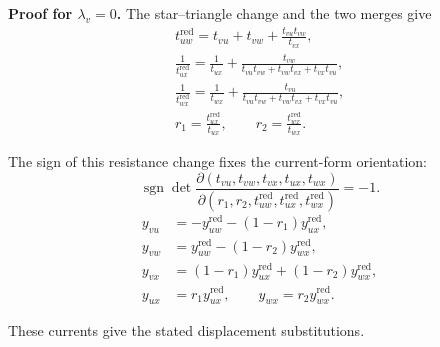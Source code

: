 \documentclass[11pt]{article}
\numberwithin{equation}{section}
\numberwithin{figure}{section}
\numberwithin{table}{section}
\begin{document}
\begin{proofbox}
\textbf{Proof for $\lambda_v=0$.} The star--triangle change \cite[Lemma 2.4.23]{Panzer} and the two merges give
\begin{equation*}
\begin{gathered}
t_{uw}^{\mathrm{red}}
=t_{vu}+t_{vw}+\frac{t_{vu}t_{vw}}{t_{vx}},\\
\frac1{t_{ux}^{\mathrm{red}}}
=\frac1{t_{ux}}+
\frac{t_{vw}}{t_{vu}t_{vw}+t_{vw}t_{vx}+t_{vx}t_{vu}},\\
\frac1{t_{wx}^{\mathrm{red}}}
=\frac1{t_{wx}}+
\frac{t_{vu}}{t_{vu}t_{vw}+t_{vw}t_{vx}+t_{vx}t_{vu}},\\
r_1=\frac{t_{ux}^{\mathrm{red}}}{t_{ux}},\qquad
r_2=\frac{t_{wx}^{\mathrm{red}}}{t_{wx}}.
\end{gathered}
\end{equation*}

The sign of this resistance change fixes the current-form orientation:
\begin{equation*}
\operatorname{sgn}\det
\frac{\partial(t_{vu},t_{vw},t_{vx},t_{ux},t_{wx})}
{\partial(r_1,r_2,t_{uw}^{\mathrm{red}},t_{ux}^{\mathrm{red}},t_{wx}^{\mathrm{red}})}
=-1.
\end{equation*}
\begin{equation}\label{b-01166}
\begin{aligned}
y_{vu}&=-y_{uw}^{\mathrm{red}}-(1-r_1)y_{ux}^{\mathrm{red}},\\
y_{vw}&=y_{uw}^{\mathrm{red}}-(1-r_2)y_{wx}^{\mathrm{red}},\\
y_{vx}&=(1-r_1)y_{ux}^{\mathrm{red}}+(1-r_2)y_{wx}^{\mathrm{red}},\\
y_{ux}&=r_1y_{ux}^{\mathrm{red}},\qquad y_{wx}=r_2y_{wx}^{\mathrm{red}}.
\end{aligned}
\end{equation}

These currents give the stated displacement substitutions.


\end{proofbox}
\end{document}
